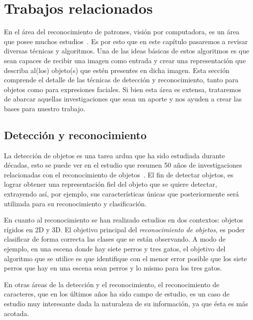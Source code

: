 \chapter[Trabajos relacionados ]{Trabajos relacionados }\label{ch:capitulo2}

En el área del reconocimiento de patrones, visión por computadora, es un área que posee muchos estudios~\cite{Andreopoulos2013}. Es por esto que en este capítulo pasaremos a revisar diversas técnicas y algoritmos. Una de las ideas básicas de estos algoritmos es que sean capaces de recibir una imagen como entrada y crear una representación que describa al(los) objeto(s) que estén presentes en dicha imagen. Esta sección comprende el detalle de las técnicas de detección y reconocimiento, tanto para objetos como para expresiones faciales. Si bien esta área es extensa, trataremos de abarcar aquellas investigaciones que sean un aporte y nos ayuden a crear las bases para nuestro trabajo.

\section{Detección y reconocimiento}
La detección de objetos es una tarea ardua que ha sido estudiada durante décadas, esto se puede ver en el estudio que resumen 50 años de investigaciones relacionadas con el reconocimiento de objetos~\cite{Andreopoulos2013}. El fin de detectar objetos, es lograr obtener una representación fiel del objeto que se quiere detectar, extrayendo así, por ejemplo, sus características únicas que posteriormente será utilizada para su reconocimiento y clasificación.

En cuanto al reconocimiento se han realizado estudios en dos contextos: objetos rígidos en 2D y 3D\@. El objetivo principal del \textit{reconocimiento de objetos}, es poder clasificar de forma correcta las clases que se están observando. A modo de ejemplo, en una escena donde hay siete perros y tres gatos, el objetivo del algoritmo que se utilice es que identifique con el menor error posible que los siete perros que hay en una escena sean perros y lo mismo para los tres gatos.

En otras áreas de la detección y el reconocimiento, el reconocimiento de caracteres, que en los últimos años ha sido campo de estudio, es un caso de estudio muy interesante dada la naturaleza de su información, ya que ésta es más acotada. 

